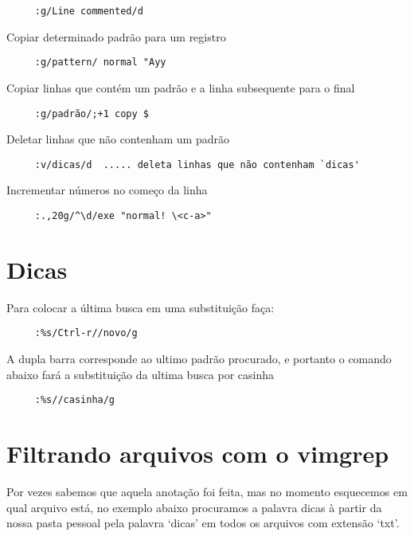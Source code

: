 \begin{verbatim}
     :g/Line commented/d
\end{verbatim}

Copiar determinado padrão para um registro

\begin{verbatim}
     :g/pattern/ normal "Ayy
\end{verbatim}

Copiar linhas que contém um padrão e a linha subsequente para o final

\begin{verbatim}
     :g/padrão/;+1 copy $
\end{verbatim}

Deletar linhas que não contenham um padrão

\begin{verbatim}
     :v/dicas/d  ..... deleta linhas que não contenham `dicas'
\end{verbatim}

Incrementar números no começo da linha

\begin{verbatim}
     :.,20g/^\d/exe "normal! \<c-a>"
\end{verbatim}

\section{Dicas }
Para colocar a última busca em uma substituição faça:

\begin{verbatim}
     :%s/Ctrl-r//novo/g
\end{verbatim}

A dupla barra corresponde ao ultimo padrão procurado, e portanto o
comando abaixo fará a substituição da ultima busca por casinha

\begin{verbatim}
     :%s//casinha/g
\end{verbatim}

\section{Filtrando arquivos com o vimgrep}
\label{Filtrando arquivos com o vimgrep}

Por vezes sabemos que aquela anotação foi feita, mas no momento esquecemos em qual
arquivo está, no exemplo abaixo procuramos a palavra dicas à partir da nossa pasta pessoal
pela palavra `dicas' em todos os arquivos com extensão `txt'.

